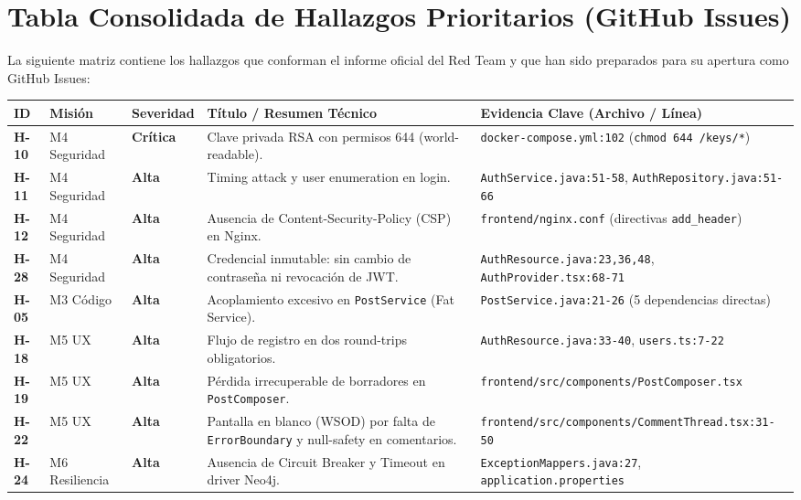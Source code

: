 \documentclass[10pt,a4paper]{article}
\newcommand{\code}[1]{\nolinkurl{#1}}
\newcommand{\badgeCritica}{\colorbox{red!20}{\textcolor{red!80!black}{\textbf{\footnotesize Crítica}}}}
\newcommand{\badgeAlta}{\colorbox{orange!20}{\textcolor{orange!90!black}{\textbf{\footnotesize Alta}}}}
\begin{document}
\section{Tabla Consolidada de Hallazgos Prioritarios (GitHub Issues)}

La siguiente matriz contiene los hallazgos que conforman el informe oficial del Red Team y que han sido preparados para su apertura como GitHub Issues:

\vspace{0.5em}
\noindent
\begin{tabularx}{\textwidth}{p{1.0cm} p{1.6cm} p{1.9cm} X >{\raggedright\arraybackslash}p{4.7cm}}
\rowcolor{tableheader}\toprule
\textbf{ID} & \textbf{Misión} & \textbf{Severidad} & \textbf{Título / Resumen Técnico} & \textbf{Evidencia Clave (Archivo / Línea)} \\ \midrule
\textbf{H-10} & M4 Seguridad & \badgeCritica & Clave privada RSA con permisos 644 (world-readable). & \code{docker-compose.yml:102} (\code{chmod 644 /keys/*}) \\ \midrule
\textbf{H-11} & M4 Seguridad & \badgeAlta & Timing attack y user enumeration en login. & \code{AuthService.java:51-58}, \code{AuthRepository.java:51-66} \\ \midrule
\textbf{H-12} & M4 Seguridad & \badgeAlta & Ausencia de Content-Security-Policy (CSP) en Nginx. & \code{frontend/nginx.conf} (directivas \code{add_header}) \\ \midrule
\textbf{H-28} & M4 Seguridad & \badgeAlta & Credencial inmutable: sin cambio de contraseña ni revocación de JWT. & \code{AuthResource.java:23,36,48}, \code{AuthProvider.tsx:68-71} \\ \midrule
\textbf{H-05} & M3 Código & \badgeAlta & Acoplamiento excesivo en \code{PostService} (Fat Service). & \code{PostService.java:21-26} (5 dependencias directas) \\ \midrule
\textbf{H-18} & M5 UX & \badgeAlta & Flujo de registro en dos round-trips obligatorios. & \code{AuthResource.java:33-40}, \code{users.ts:7-22} \\ \midrule
\textbf{H-19} & M5 UX & \badgeAlta & Pérdida irrecuperable de borradores en \code{PostComposer}. & \code{frontend/src/components/PostComposer.tsx} \\ \midrule
\textbf{H-22} & M5 UX & \badgeAlta & Pantalla en blanco (WSOD) por falta de \code{ErrorBoundary} y null-safety en comentarios. & \code{frontend/src/components/CommentThread.tsx:31-50} \\ \midrule
\textbf{H-24} & M6 Resiliencia & \badgeAlta & Ausencia de Circuit Breaker y Timeout en driver Neo4j. & \code{ExceptionMappers.java:27}, \code{application.properties} \\ \bottomrule
\end{tabularx}
\vspace{1em}
\end{document}
